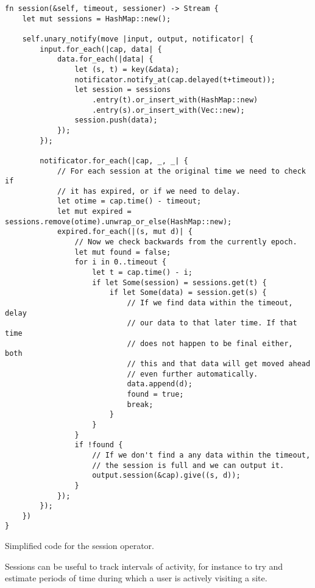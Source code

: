 \begin{listing}[H]
\begin{verbatim}
fn session(&self, timeout, sessioner) -> Stream {
    let mut sessions = HashMap::new();
    
    self.unary_notify(move |input, output, notificator| {
        input.for_each(|cap, data| {
            data.for_each(|data| {
                let (s, t) = key(&data);
                notificator.notify_at(cap.delayed(t+timeout));
                let session = sessions
                    .entry(t).or_insert_with(HashMap::new)
                    .entry(s).or_insert_with(Vec::new);
                session.push(data);
            });
        });
        
        notificator.for_each(|cap, _, _| {
            // For each session at the original time we need to check if
            // it has expired, or if we need to delay.
            let otime = cap.time() - timeout;
            let mut expired = sessions.remove(otime).unwrap_or_else(HashMap::new);
            expired.for_each(|(s, mut d)| {
                // Now we check backwards from the currently epoch.
                let mut found = false;
                for i in 0..timeout {
                    let t = cap.time() - i;
                    if let Some(session) = sessions.get(t) {
                        if let Some(data) = session.get(s) {
                            // If we find data within the timeout, delay
                            // our data to that later time. If that time
                            // does not happen to be final either, both
                            // this and that data will get moved ahead
                            // even further automatically.
                            data.append(d);
                            found = true;
                            break;
                        }
                    }
                }
                if !found {
                    // If we don't find a any data within the timeout,
                    // the session is full and we can output it.
                    output.session(&cap).give((s, d));
                }
            });
        });
    })
}
\end{verbatim}
  \caption{Simplified code for the session operator.}
  \label{lst:session}
\end{listing}

Sessions can be useful to track intervals of activity, for instance to try and estimate periods of time during which a user is actively visiting a site.

